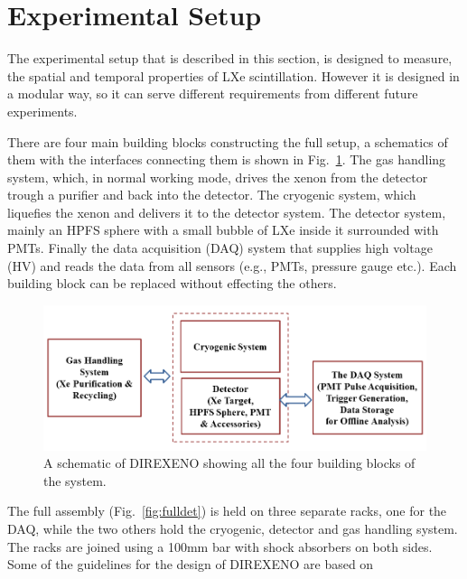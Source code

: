 \section{Experimental Setup}
\label{expSetup}

The experimental setup that is described in this section, is designed to measure, the spatial and 
temporal properties of LXe scintillation. However it is designed in a modular way, so it can serve different 
requirements from different future experiments. 

There are four main building blocks constructing the full setup, a schematics of them with the interfaces connecting them is shown in Fig.~\ref{fig:fullschematics}. The gas handling system, which, in normal working mode, drives the xenon from the detector trough a purifier and back into the detector. The cryogenic system, which liquefies the xenon and delivers it to the detector system. The detector system, mainly an HPFS sphere with a small bubble of LXe inside it surrounded with PMTs. Finally the data acquisition (DAQ) system that supplies high voltage (HV) and reads the data from all sensors (e.g., PMTs, pressure gauge etc.). Each building block can be replaced without effecting the others. 

\begin{figure}[t!]
\centerline{\includegraphics[width=0.8\linewidth]{WholeSys.png}}
\caption{A schematic of DIREXENO showing all the four building blocks of the system.}
\label{fig:fullschematics}
\end{figure}

The full assembly (Fig.~\ref{fig:fulldet}) is held on three separate racks, one for the DAQ, while the two others hold the cryogenic, detector and gas handling system. The racks are joined using a 100mm bar with shock absorbers on both sides. Some of the guidelines for the design of DIREXENO are based on~\cite{Giboni}  

